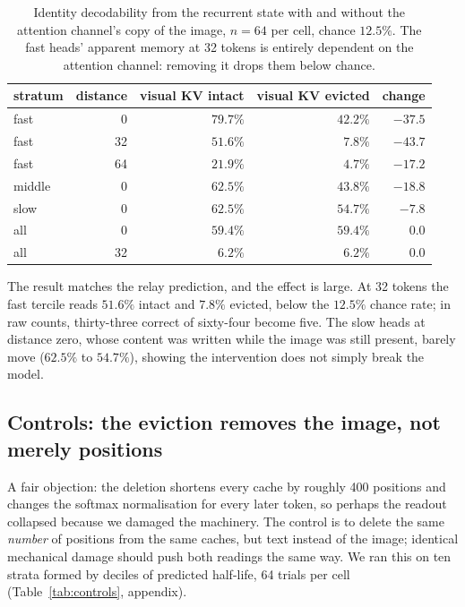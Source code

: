 \begin{table}[t]
\centering\small
\begin{tabular}{lrrrr}
\toprule
stratum & distance & visual KV intact & visual KV evicted & change \\
\midrule
fast   & 0  & $79.7\%$ & $42.2\%$ & $-37.5$ \\
fast   & 32 & $51.6\%$ & $\mathbf{7.8\%}$  & $-43.7$ \\
fast   & 64 & $21.9\%$ & $4.7\%$  & $-17.2$ \\
\addlinespace
middle & 0  & $62.5\%$ & $43.8\%$ & $-18.8$ \\
slow   & 0  & $62.5\%$ & $54.7\%$ & $-7.8$  \\
\addlinespace
all    & 0  & $59.4\%$ & $59.4\%$ & $0.0$   \\
all    & 32 & $6.2\%$  & $6.2\%$  & $0.0$   \\
\bottomrule
\end{tabular}
\caption{Identity decodability from the recurrent state with and without the
attention channel's copy of the image, $n = 64$ per cell, chance $12.5\%$. The
fast heads' apparent memory at 32 tokens is entirely dependent on the attention
channel: removing it drops them below chance.}
\label{tab:relay}
\end{table}

The result matches the relay prediction, and the effect is large. At 32 tokens
the fast tercile reads $51.6\%$ intact and $7.8\%$ evicted, below the
$12.5\%$ chance rate; in raw counts, thirty-three correct of sixty-four become
five. The slow heads at distance zero, whose content was written while the
image was still present, barely move ($62.5\%$ to $54.7\%$), showing the
intervention does not simply break the model.

\subsection{Controls: the eviction removes the image, not merely positions}
\label{sec:controls}

A fair objection: the deletion shortens every cache by roughly 400 positions
and changes the softmax normalisation for every later token, so perhaps the
readout collapsed because we damaged the machinery. The control is to delete
the same \emph{number} of positions from the same caches, but text instead of
the image; identical mechanical damage should push both readings the same way.
We ran this on ten strata formed by deciles of predicted half-life, 64 trials
per cell (Table~\ref{tab:controls}, appendix).

